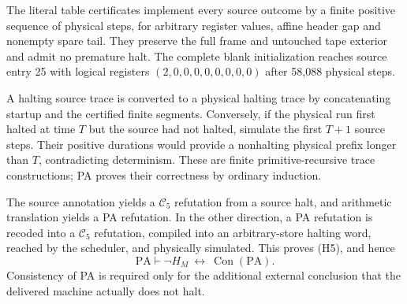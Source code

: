 The literal table certificates implement every source outcome by a finite
positive sequence of physical steps, for arbitrary register values,
affine header gap and nonempty spare tail. They preserve the full frame
and untouched tape exterior and admit no premature halt. The complete blank
initialization reaches source entry 25 with logical registers
$(2,0,0,0,0,0,0,0,0)$ after 58,088 physical steps.

A halting source trace is converted to a physical halting trace by
concatenating startup and the certified finite segments. Conversely,
if the physical run first halted at time $T$ but the source had not
halted, simulate the first $T+1$ source steps. Their positive durations
would provide a nonhalting physical prefix longer than $T$, contradicting
determinism. These are finite primitive-recursive trace constructions;
PA proves their correctness by ordinary induction.

The source annotation yields a $\mathcal C_5$ refutation from a source
halt, and arithmetic translation yields a PA refutation. In the other
direction, a PA refutation is recoded into a $\mathcal C_5$ refutation,
compiled into an arbitrary-store halting word, reached by the scheduler,
and physically simulated. This proves (H5), and hence
\[
 \boxed{\mathrm{PA}\vdash
       \neg H_M\ \longleftrightarrow\ \operatorname{Con}(\mathrm{PA}).}
\]
Consistency of PA is required only for the additional external conclusion
that the delivered machine actually does not halt.
